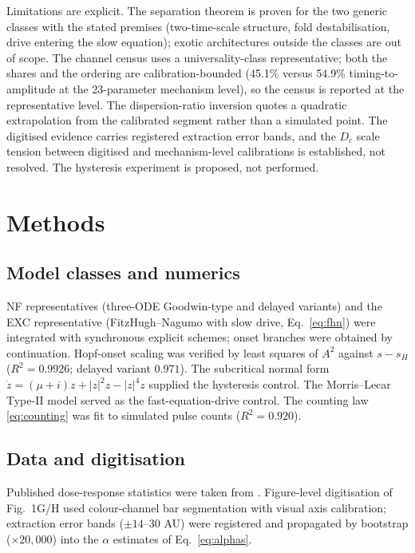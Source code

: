 \documentclass[11pt,a4paper]{article}
\begin{document}
Limitations are explicit. The separation theorem is proven for the two generic classes with the stated premises (two-time-scale structure, fold destabilisation, drive entering the slow equation); exotic architectures outside the classes are out of scope. The channel census uses a universality-class representative; both the shares and the ordering are calibration-bounded (45.1\% versus 54.9\% timing-to-amplitude at the 23-parameter mechanism level), so the census is reported at the representative level. The dispersion-ratio inversion quotes a quadratic extrapolation from the calibrated segment rather than a simulated point. The digitised evidence carries registered extraction error bands, and the $D_c$ scale tension between digitised and mechanism-level calibrations is established, not resolved. The hysteresis experiment is proposed, not performed.

\section{Methods}
\label{sec:methods}

\subsection{Model classes and numerics}

NF representatives (three-ODE Goodwin-type and delayed variants) and the EXC representative (FitzHugh--Nagumo with slow drive, Eq.~\eqref{eq:fhn}) were integrated with synchronous explicit schemes; onset branches were obtained by continuation. Hopf-onset scaling was verified by least squares of $A^2$ against $s-s_H$ ($R^2=0.9926$; delayed variant $0.971$). The subcritical normal form $\dot z=(\mu+i)z+|z|^2z-|z|^4z$ supplied the hysteresis control. The Morris--Lecar Type-II model served as the fast-equation-drive control. The counting law \eqref{eq:counting} was fit to simulated pulse counts ($R^2=0.920$).

\subsection{Data and digitisation}

Published dose-response statistics were taken from \cite{Lahav2004,GevaZatorsky2006,Batchelor2011,Monke2017,Loewer2013,StewartOrnstein2017,Loewer2010}. Figure-level digitisation of \cite{Batchelor2011} Fig.~1G/H used colour-channel bar segmentation with visual axis calibration; extraction error bands ($\pm14$--$30$ AU) were registered and propagated by bootstrap ($\times20{,}000$) into the $\alpha$ estimates of Eq.~\eqref{eq:alphas}.
\end{document}
